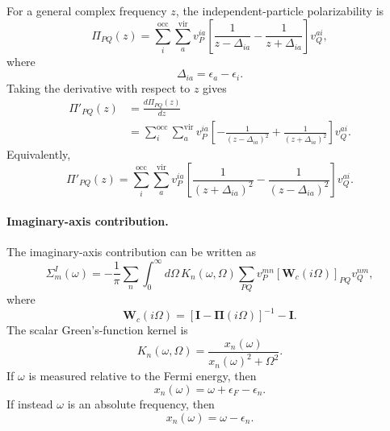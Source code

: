 For a general complex frequency \(z\), the independent-particle
polarizability is
\begin{equation}
    \Pi_{PQ}(z)
    =
    \sum_i^{\mathrm{occ}}
    \sum_a^{\mathrm{vir}}
    v_P^{ia}
    \left[
    \frac{1}{z-\Delta_{ia}}
    -
    \frac{1}{z+\Delta_{ia}}
    \right]
    v_Q^{ai},
\end{equation}
where
\begin{equation}
    \Delta_{ia}=\epsilon_a-\epsilon_i.
\end{equation}
Taking the derivative with respect to \(z\) gives
\begin{align}
    \Pi'_{PQ}(z)
    &=
    \frac{d\Pi_{PQ}(z)}{dz} \\
    &=
    \sum_i^{\mathrm{occ}}
    \sum_a^{\mathrm{vir}}
    v_P^{ia}
    \left[
    -\frac{1}{(z-\Delta_{ia})^2}
    +
    \frac{1}{(z+\Delta_{ia})^2}
    \right]
    v_Q^{ai}.
\end{align}
Equivalently,
\begin{equation}
    \boxed{
    \Pi'_{PQ}(z)
    =
    \sum_i^{\mathrm{occ}}
    \sum_a^{\mathrm{vir}}
    v_P^{ia}
    \left[
    \frac{1}{(z+\Delta_{ia})^2}
    -
    \frac{1}{(z-\Delta_{ia})^2}
    \right]
    v_Q^{ai}
    }.
\end{equation}

\paragraph{Imaginary-axis contribution.}

The imaginary-axis contribution can be written as
\begin{equation}
    \Sigma_m^I(\omega)
    =
    -\frac{1}{\pi}
    \sum_n
    \int_0^\infty d\Omega\,
    K_n(\omega,\Omega)
    \sum_{PQ}
    v_P^{mn}
    \left[
    \mathbf W_c(i\Omega)
    \right]_{PQ}
    v_Q^{nm},
\end{equation}
where
\begin{equation}
    \mathbf W_c(i\Omega)
    =
    \left[
    \mathbf I-\boldsymbol{\Pi}(i\Omega)
    \right]^{-1}
    -
    \mathbf I.
\end{equation}
The scalar Green's-function kernel is
\begin{equation}
    K_n(\omega,\Omega)
    =
    \frac{x_n(\omega)}
    {x_n(\omega)^2+\Omega^2}.
\end{equation}
If \(\omega\) is measured relative to the Fermi energy, then
\begin{equation}
    x_n(\omega)
    =
    \omega+\epsilon_F-\epsilon_n.
\end{equation}
If instead \(\omega\) is an absolute frequency, then
\begin{equation}
    x_n(\omega)
    =
    \omega-\epsilon_n.
\end{equation}

